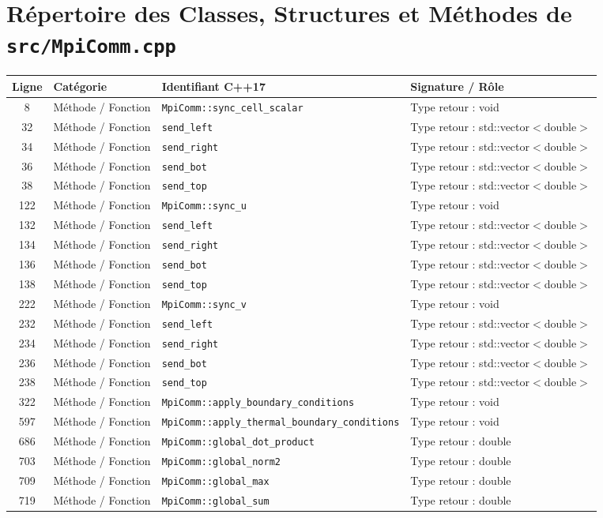 \documentclass[10pt,a4paper,oneside]{book}
\begin{document}
\section{Répertoire des Classes, Structures et Méthodes de \texttt{src/MpiComm.cpp}}
\begin{center}\small
\begin{tabular}{clll}
\toprule
\textbf{Ligne} & \textbf{Catégorie} & \textbf{Identifiant C++17} & \textbf{Signature / Rôle} \\
\midrule
8 & Méthode / Fonction & \texttt{MpiComm::sync\_cell\_scalar} & Type retour : void \\
32 & Méthode / Fonction & \texttt{send\_left} & Type retour : std::vector$<$double$>$ \\
34 & Méthode / Fonction & \texttt{send\_right} & Type retour : std::vector$<$double$>$ \\
36 & Méthode / Fonction & \texttt{send\_bot} & Type retour : std::vector$<$double$>$ \\
38 & Méthode / Fonction & \texttt{send\_top} & Type retour : std::vector$<$double$>$ \\
122 & Méthode / Fonction & \texttt{MpiComm::sync\_u} & Type retour : void \\
132 & Méthode / Fonction & \texttt{send\_left} & Type retour : std::vector$<$double$>$ \\
134 & Méthode / Fonction & \texttt{send\_right} & Type retour : std::vector$<$double$>$ \\
136 & Méthode / Fonction & \texttt{send\_bot} & Type retour : std::vector$<$double$>$ \\
138 & Méthode / Fonction & \texttt{send\_top} & Type retour : std::vector$<$double$>$ \\
222 & Méthode / Fonction & \texttt{MpiComm::sync\_v} & Type retour : void \\
232 & Méthode / Fonction & \texttt{send\_left} & Type retour : std::vector$<$double$>$ \\
234 & Méthode / Fonction & \texttt{send\_right} & Type retour : std::vector$<$double$>$ \\
236 & Méthode / Fonction & \texttt{send\_bot} & Type retour : std::vector$<$double$>$ \\
238 & Méthode / Fonction & \texttt{send\_top} & Type retour : std::vector$<$double$>$ \\
322 & Méthode / Fonction & \texttt{MpiComm::apply\_boundary\_conditions} & Type retour : void \\
597 & Méthode / Fonction & \texttt{MpiComm::apply\_thermal\_boundary\_conditions} & Type retour : void \\
686 & Méthode / Fonction & \texttt{MpiComm::global\_dot\_product} & Type retour : double \\
703 & Méthode / Fonction & \texttt{MpiComm::global\_norm2} & Type retour : double \\
709 & Méthode / Fonction & \texttt{MpiComm::global\_max} & Type retour : double \\
719 & Méthode / Fonction & \texttt{MpiComm::global\_sum} & Type retour : double \\
\bottomrule
\end{tabular}
\end{center}
\end{document}

